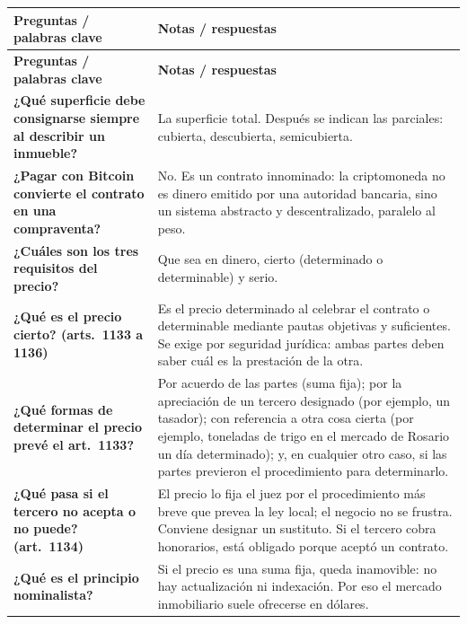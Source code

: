 \documentclass[12pt,oneside]{book}
\begin{document}
\begin{longtable}{@{}>{\raggedright\arraybackslash}p{}>{\raggedright\arraybackslash}p{}@{}}
\toprule
\textbf{Preguntas / palabras clave} & \textbf{Notas / respuestas} \\
\midrule
\endfirsthead
\toprule
\textbf{Preguntas / palabras clave} & \textbf{Notas / respuestas} \\
\midrule
\endhead
\bottomrule
\endfoot

\textbf{¿Qu\'e superficie debe consignarse siempre al describir un inmueble?} &
La superficie total. Despu\'es se indican las parciales: cubierta, descubierta, semicubierta. \\[0.8em]

\textbf{¿Pagar con Bitcoin convierte el contrato en una compraventa?} &
No. Es un contrato innominado: la criptomoneda no es dinero emitido por una autoridad bancaria, sino un sistema abstracto y descentralizado, paralelo al peso. \\[0.8em]

\textbf{¿Cu\'ales son los tres requisitos del precio?} &
Que sea en dinero, cierto (determinado o determinable) y serio. \\[0.8em]

\textbf{¿Qu\'e es el precio cierto? (arts.~1133 a 1136)} &
Es el precio determinado al celebrar el contrato o determinable mediante pautas objetivas y suficientes. Se exige por seguridad jur\'idica: ambas partes deben saber cu\'al es la prestaci\'on de la otra. \\[0.8em]

\textbf{¿Qu\'e formas de determinar el precio prev\'e el art.~1133?} &
Por acuerdo de las partes (suma fija); por la apreciaci\'on de un tercero designado (por ejemplo, un tasador); con referencia a otra cosa cierta (por ejemplo, toneladas de trigo en el mercado de Rosario un d\'ia determinado); y, en cualquier otro caso, si las partes previeron el procedimiento para determinarlo. \\[0.8em]

\textbf{¿Qu\'e pasa si el tercero no acepta o no puede? (art.~1134)} &
El precio lo fija el juez por el procedimiento m\'as breve que prevea la ley local; el negocio no se frustra. Conviene designar un sustituto. Si el tercero cobra honorarios, est\'a obligado porque acept\'o un contrato. \\[0.8em]

\textbf{¿Qu\'e es el principio nominalista?} &
Si el precio es una suma fija, queda inamovible: no hay actualizaci\'on ni indexaci\'on. Por eso el mercado inmobiliario suele ofrecerse en d\'olares. \\[0.8em]


\end{longtable}
\end{document}
